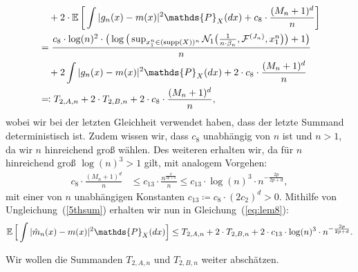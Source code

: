 {\begin{equation}
\begin{split}
& \quad + 2 \cdot \E\bigg[\int |g_{n}(x) - m(x)|^2 \mathds{P}_X(dx) + c_8 \cdot \frac{(M_n + 1)^d}{n}\bigg] \\
& = \frac{c_8 \cdot \log(n)^2 \cdot \big(\log\big(\sup_{x_1^n \in (\supp(X))^n}\mathcal{N}_1\big(\frac{1}{n \cdot \beta_n},\mathcal{F}^{(J_n)},x_1^n\big)\big) + 1\big)}{n} \\
& \quad + 2 \int |g_{n}(x) - m(x)|^2 \mathds{P}_X(dx) + 2 \cdot c_8 \cdot \frac{(M_n + 1)^d}{n} \\
& \eqqcolon T_{2,A,n} + 2 \cdot T_{2,B,n} + 2 \cdot c_8 \cdot \frac{(M_n + 1)^d}{n},
\end{split}
\end{equation}
wobei wir bei der letzten Gleichheit verwendet haben, dass der letzte Summand deterministisch ist. Zudem wissen wir, dass $c_8$ unabhängig von $n$ ist und $n > 1$, da wir $n$ hinreichend groß wählen.
Des weiteren erhalten wir, da für $n$ hinreichend groß $\log(n)^3 > 1$ gilt, mit analogem Vorgehen:
\begin{equation}
\label{5thsum}
\begin{split}
c_8 \cdot \frac{(M_n + 1)^d}{n} & \leq c_{13} \cdot \frac{n^{\frac{d}{2p + d}}}{n} \leq c_{13} \cdot \log(n)^3 \cdot n^{- \frac{2p}{2p + d}} ,
\end{split}
\end{equation} 
mit einer von $n$ unabhängigen Konstanten $c_{13} \coloneqq c_8 \cdot (2c_2)^d > 0$.
Mithilfe von Ungleichung~(\ref{5thsum}) erhalten wir nun in Gleichung~(\ref{eq:lem8}):
$$
\E \Big[\int |\hat{m}_n(x) - m(x)|^2 \mathds{P}_X(dx)\Big] \leq T_{2,A,n} + 2 \cdot T_{2,B,n} + 2 \cdot c_{13} \cdot \log(n)^3 \cdot n^{- \frac{2p}{2p + d}}.
$$

Wir wollen die Summanden $T_{2,A,n}$ und $T_{2,B,n}$ weiter abschätzen.

}

